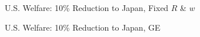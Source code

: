 \documentclass[9pt,pdftex,aspectratio=1610]{beamer}
\theoremstyle{definition}
\begin{document}
\begin{frame}[t]{U.S. Welfare: 10\% Reduction to Japan, {\color{red} Fixed $R$ \& $w$} }
\begin{figure}[!t]
\end{figure}
\end{frame}

\begin{frame}[t]{U.S. Welfare: 10\% Reduction to Japan, {\color{red} GE} }
\begin{figure}[!t]
\end{figure}
\end{frame}
\end{document}
